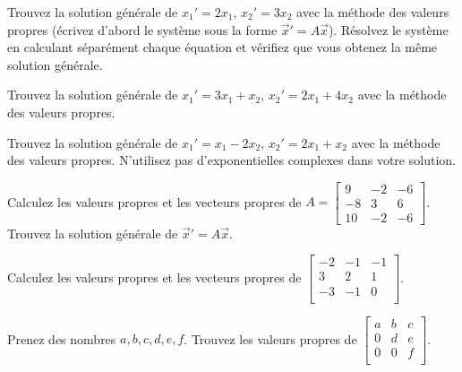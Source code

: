 \begin{exercise}
\leavevmode
\begin{tasks}
\task
Trouvez la solution générale de $x_1' = 2 x_1$, $x_2' = 3 x_2$ avec la méthode des valeurs propres (écrivez d’abord le système sous la forme
${\vec{x}}' = A \vec{x}$).
\task
Résolvez le système en calculant séparément chaque équation et vérifiez que vous obtenez la même solution générale.
\end{tasks}
\end{exercise}

\begin{exercise}
Trouvez la solution générale de $x_1' = 3 x_1 + x_2$,
$x_2' = 2 x_1 + 4 x_2$ avec la méthode des valeurs propres.
\end{exercise}

\begin{exercise}
Trouvez la solution générale de $x_1' = x_1 -2 x_2$,
$x_2' = 2 x_1 + x_2$ avec la méthode des valeurs propres. N’utilisez pas d'exponentielles complexes dans votre solution.
\end{exercise}

\begin{exercise}
\leavevmode
\begin{tasks}
\task
Calculez les valeurs propres et les vecteurs propres de
$A = \left[ \begin{smallmatrix}
9 & -2 & -6 \\
-8 & 3 & 6 \\
10 & -2 & -6
\end{smallmatrix} \right]$.
\task
Trouvez la solution générale de ${\vec{x}}' = A \vec{x}$.
\end{tasks}
\end{exercise}

\begin{exercise}
Calculez les valeurs propres et les vecteurs propres de
$\left[ \begin{smallmatrix}
-2 & -1 & -1 \\
3 & 2 & 1 \\
-3 & -1 & 0 \\
\end{smallmatrix} \right]$.
\end{exercise}

\begin{exercise}
Prenez des nombres $a,b,c,d,e,f$. Trouvez les valeurs propres de
$\left[ \begin{smallmatrix}
a & b & c \\
0 & d & e \\
0 & 0 & f \\
\end{smallmatrix} \right]$.
\end{exercise}

